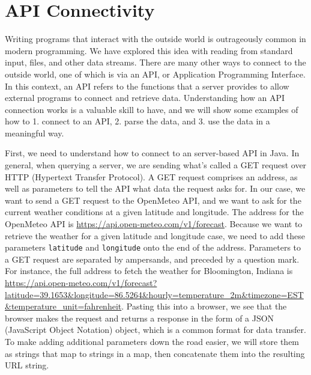 \section{API Connectivity}
Writing programs that interact with the outside world is outrageously common in modern programming. We have explored this idea with reading from standard input, files, and other data streams. There are many other ways to connect to the outside world, one of which is via an API, or Application Programming Interface. In this context, an API refers to the functions that a server provides to allow external programs to connect and retrieve data. Understanding how an API connection works is a valuable skill to have, and we will show some examples of how to 1. connect to an API, 2. parse the data, and 3. use the data in a meaningful way.


First, we need to understand how to connect to an server-based API in Java. In general, when querying a server, we are sending what's called a GET request over HTTP (Hypertext Transfer Protocol). A GET request comprises an address, as well as parameters to tell the API what data the request asks for. In our case, we want to send a GET request to the OpenMeteo API, and we want to ask for the current weather conditions at a given latitude and longitude. The address for the OpenMeteo API is \url{https://api.open-meteo.com/v1/forecast}. Because we want to retrieve the weather for a given latitude and longitude case, we need to add these parameters \texttt{latitude} and \texttt{longitude} onto the end of the address. Parameters to a GET request are separated by ampersands, and preceded by a question mark. For instance, the full address to fetch the weather for Bloomington, Indiana is \url{https://api.open-meteo.com/v1/forecast?latitude=39.1653&longitude=86.5264&hourly=temperature\_2m&timezone=EST&temperature_unit=fahrenheit}. Pasting this into a browser, we see that the browser makes the request and returns a response in the form of a JSON (JavaScript Object Notation) object, which is a common format for data transfer. To make adding additional parameters down the road easier, we will store them as strings that map to strings in a map, then concatenate them into the resulting URL string.

